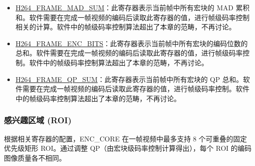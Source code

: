 \documentclass[main\_\_CN.tex]{subfiles}
\begin{document}
\begin{itemize}
    \item \hyperref[fielddesc:H264FRAMEMADSUM]{H264\_FRAME\_MAD\_SUM}：此寄存器表示当前帧中所有宏块的 MAD 累积和。软件需要在完成一帧视频的编码后读取此寄存器的值，进行帧级码率控制相关的计算。软件中的帧级码率控制算法超出了本章的范畴，不再讨论。
    \item \hyperref[fielddesc:H264FRAMEENCBITS]{H264\_FRAME\_ENC\_BITS}：此寄存器表示当前帧中所有宏块的编码位数的总和。软件需要在完成一帧视频的编码后读取此寄存器的值，进行帧级码率控制。软件中的帧级码率控制算法超出了本章的范畴，不再讨论。
    \item \hyperref[fielddesc:H264FRAMEQPSUM]{H264\_FRAME\_QP\_SUM}：此寄存器表示当前帧中所有宏块的 QP 总和。软件需要在完成一帧视频的编码后读取此寄存器的值，进行帧级码率控制。软件中的帧级码率控制算法超出了本章的范畴，不再讨论。
\end{itemize}


\subsubsection{感兴趣区域 (ROI)}\label{sec:h264-roi}
根据相关寄存器的配置，ENC\_CORE 在一帧视频中最多支持 8 个可重叠的固定优先级矩形 ROI。通过调整 QP（由宏块级码率控制计算得出），每个 ROI 的编码图像质量各不相同。
\end{document}
